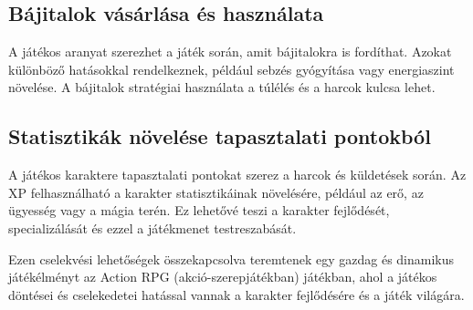 \subsection{Bájitalok vásárlása és használata}

 A játékos aranyat szerezhet a játék során, amit bájitalokra is fordíthat. Azokat különböző hatásokkal rendelkeznek, például sebzés gyógyítása vagy energiaszint növelése. A bájitalok stratégiai használata a túlélés és a harcok kulcsa lehet.

\subsection{Statisztikák növelése tapasztalati pontokból}

 A játékos karaktere tapasztalati pontokat szerez a harcok és küldetések során. Az XP felhasználható a karakter statisztikáinak növelésére, például az erő, az ügyesség vagy a mágia terén. Ez lehetővé teszi a karakter fejlődését, specializálását és ezzel a játékmenet testreszabását.

Ezen cselekvési lehetőségek összekapcsolva teremtenek egy gazdag és dinamikus játékélményt az Action RPG (akció-szerepjátékban) játékban, ahol a játékos döntései és cselekedetei hatással vannak a karakter fejlődésére és a játék világára.



